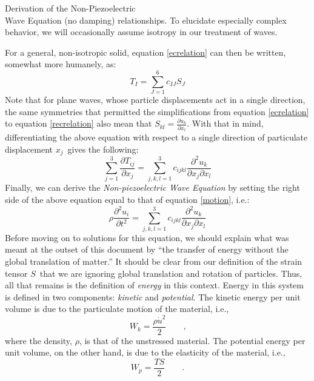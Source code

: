 \documentclass[a4paper,10pt]{report}
\numberwithin{equation}{section}
\begin{document}
{\begin{chapter}
\begin{section}{Derivation of the Non-Piezoelectric \\Wave Equation (no damping)}
relationships. \cite{Ballantine1997} To elucidate especially complex behavior, we will occasionally assume isotropy in our treatment of waves.
\par
For a general, non-isotropic solid, equation \eqref{ecrelation} can then be written, somewhat more humanely, as:
\begin{equation}
 T_{I} = \sum_{J=1}^{6} c_{IJ} S_{J}
\end{equation}
Note that for plane waves, whose particle displacements act in a single direction, the same symmetries that permitted the simplifications from equation \eqref{ecrelation} to equation \eqref{recrelation} also mean that $S_{kl} =\frac{\partial u_k}{\partial x_l}$. With that in mind, differentiating the above equation with respect to a single direction of particulate displacement $x_j$\  gives the following\cite{Ballantine1997}:
\begin{equation}
 \sum_{j=1}^3 \frac{\partial T_{ij}}{\partial x_{j}} = \sum_{j,k,l=1}^3 c_{ijkl}\frac{\partial^2 u_k}{\partial x_j \partial x_l}
\end{equation}
Finally, we can derive the \emph{Non-piezoelectric Wave Equation} by setting the right side of the above equation equal to that of equation \eqref{motion}, i.e.:
\begin{equation}
 \rho\frac{\partial^2u_i}{\partial t^2} = \sum_{j,k,l=1}^3 c_{ijkl} \frac{\partial^2 u_k}{\partial x_j \partial x_l}
\end{equation}
Before moving on to solutions for this equation, we should explain what was meant at the outset of this document by ``the transfer of energy without the global translation of matter.'' It should be clear from our definition of the strain tensor $S$\  that we are ignoring global translation and rotation of particles. Thus, all that remains is the definition of \emph{energy} in this context. Energy in this system is defined in two components: \emph{kinetic} and \emph{potential}. The kinetic energy per unit volume is due to the particulate motion of the material, i.e.\cite[p.~6]{Kino1987},
\begin{equation}
W_k = \frac{\rho \dot{u}^2}{2}\qquad \text{,}
\end{equation}
where the density, $\rho$, is that of the unstressed material. The potential energy per unit volume, on the other hand, is due to the elasticity of the material, i.e., \cite[p.~6]{Kino1987}
\begin{equation}
 W_p = \frac{TS}{2}\qquad \text{.}
\end{equation}

\end{section}
\end{chapter}}
\end{document}
